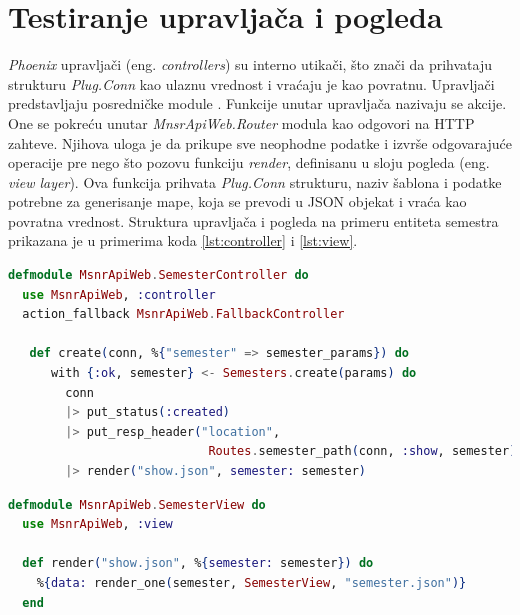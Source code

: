 \documentclass[12pt,oneside]{memoir}
\begin{document}
\section{Testiranje upravljača i pogleda}

\par \emph{Phoenix} upravljači (eng. \emph{controllers}) su interno utikači, što znači da prihvataju strukturu \emph{Plug.Conn} kao ulaznu vrednost i vraćaju je kao povratnu. Upravljači  predstavljaju posredničke module \cite{hexcontrol}. Funkcije unutar upravljača nazivaju se akcije. One se pokreću unutar \emph{MnsrApiWeb.Router} modula kao odgovori na HTTP zahteve. Njihova uloga je da prikupe sve neophodne podatke i izvrše odgovarajuće operacije pre nego što 
pozovu funkciju \emph{render}, definisanu u sloju pogleda (eng. \emph{view layer}). Ova funkcija prihvata \emph{Plug.Conn} strukturu, naziv šablona i podatke potrebne za generisanje mape, koja se prevodi u JSON objekat i vraća kao povratna vrednost. Struktura upravljača i pogleda na primeru entiteta semestra prikazana je u primerima koda \ref{lst:controller} i \ref{lst:view}. \\

\begin{minipage}{\linewidth}
\begin{lstlisting}[language=elixir, basicstyle=\small, caption={Struktura upravljača \emph{SemesterController}},captionpos=b, label={lst:controller}]
defmodule MsnrApiWeb.SemesterController do
  use MsnrApiWeb, :controller
  action_fallback MsnrApiWeb.FallbackController

   def create(conn, %{"semester" => semester_params}) do
      with {:ok, semester} <- Semesters.create(params) do
        conn
        |> put_status(:created)
        |> put_resp_header("location", 
        					Routes.semester_path(conn, :show, semester))
        |> render("show.json", semester: semester)
\end{lstlisting}
\end{minipage}



\begin{minipage}{\linewidth}
\begin{lstlisting}[language=elixir, basicstyle=\small, caption={Struktura pogleda \emph{SemesterView}},captionpos=b, label={lst:view}]
defmodule MsnrApiWeb.SemesterView do
  use MsnrApiWeb, :view

  def render("show.json", %{semester: semester}) do
    %{data: render_one(semester, SemesterView, "semester.json")}
  end
\end{lstlisting}
\end{minipage}
\end{document}
